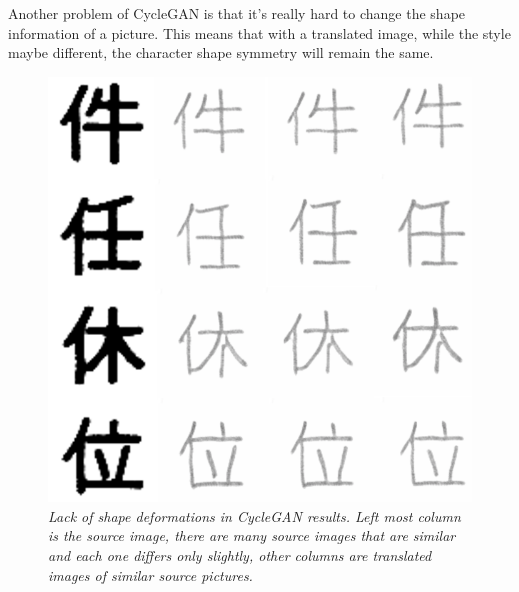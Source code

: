 \documentclass[12pt]{report}
\begin{document}
Another problem of CycleGAN is that it's really hard to change the shape information of a picture. This means that with a translated image, while the style maybe different, the character shape symmetry will remain the same.

\begin{figure}[h]
	\centering
	\includegraphics[scale=0.7]{cycle-gan-result-2}
	\caption{\textit{Lack of shape deformations in CycleGAN results. Left most column is the source image, there are many source images that are similar and each one differs only slightly, other columns are translated images of similar source pictures.}}
	\label{fig:cycle-gan-result-2}
\end{figure}
\end{document}
